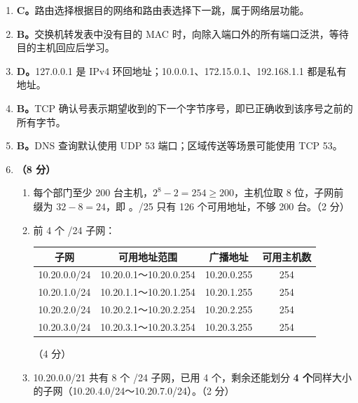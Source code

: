 \documentclass[a4paper,11pt]{article}
\begin{document}

\begin{enumerate}[start=13, label=\textbf{\arabic*.}, leftmargin=2.4em, itemsep=0.45em]

\item \textbf{C。}路由选择根据目的网络和路由表选择下一跳，属于网络层功能。

\item \textbf{B。}交换机转发表中没有目的 MAC 时，向除入端口外的所有端口泛洪，等待目的主机回应后学习。

\item \textbf{D。}127.0.0.1 是 IPv4 环回地址；10.0.0.1、172.15.0.1、192.168.1.1 都是私有地址。

\item \textbf{B。}TCP 确认号表示期望收到的下一个字节序号，即已正确收到该序号之前的所有字节。

\item \textbf{B。}DNS 查询默认使用 UDP 53 端口；区域传送等场景可能使用 TCP 53。

\item \textbf{（8 分）}
\begin{enumerate}[label=（\arabic*）, leftmargin=2.2em, itemsep=1pt]
  \item 每个部门至少 200 台主机，$2^{8}-2=254\ge200$，主机位取 8 位，子网前缀为 $32-8=24$，即 。/25 只有 126 个可用地址，不够 200 台。\hfill（2 分）
  \item 前 4 个 /24 子网：
  \begin{center}\small
  \begin{tabular}{cccc}
  \toprule
  子网 & 可用地址范围 & 广播地址 & 可用主机数 \\
  \midrule
  10.20.0.0/24 & 10.20.0.1～10.20.0.254 & 10.20.0.255 & 254 \\
  10.20.1.0/24 & 10.20.1.1～10.20.1.254 & 10.20.1.255 & 254 \\
  10.20.2.0/24 & 10.20.2.1～10.20.2.254 & 10.20.2.255 & 254 \\
  10.20.3.0/24 & 10.20.3.1～10.20.3.254 & 10.20.3.255 & 254 \\
  \bottomrule
  \end{tabular}
  \end{center}
  \hfill（4 分）
  \item 10.20.0.0/21 共有 8 个 /24 子网，已用 4 个，剩余还能划分 \textbf{4 个}同样大小的子网（10.20.4.0/24～10.20.7.0/24）。\hfill（2 分）
\end{enumerate}


\end{enumerate}
\end{document}
